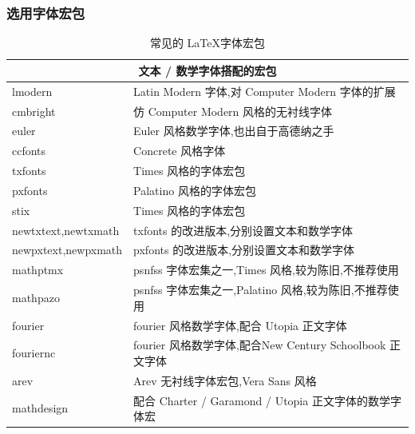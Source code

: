 \documentclass[a4paper]{ctexart}
\begin{document}
    \subsubsection{选用字体宏包}
    \begin{table}[H]
        \centering
        \caption{常见的 \LaTeX 字体宏包}\label{字体宏包}
        \begin{tabular}{ll}
            \toprule
            \multicolumn{2}{c}{\bf{文本 / 数学字体搭配的宏包}}\\
            \midrule
            lmodern                 &Latin Modern 字体,对 Computer Modern 字体的扩展        \\
            cmbright                &仿 Computer Modern 风格的无衬线字体                    \\
            euler                   &Euler 风格数学字体,也出自于高德纳之手                    \\
            ccfonts                 &Concrete 风格字体                                     \\
            txfonts                 &Times 风格的字体宏包                                   \\
            pxfonts                 &Palatino 风格的字体宏包                                \\
            stix                    &Times 风格的字体宏包                                   \\
            newtxtext,newtxmath     &txfonts 的改进版本,分别设置文本和数学字体                  \\
            newpxtext,newpxmath     &pxfonts 的改进版本,分别设置文本和数学字体                  \\
            mathptmx                &psnfss 字体宏集之一,Times 风格,较为陈旧,不推荐使用          \\
            mathpazo                &psnfss 字体宏集之一,Palatino 风格,较为陈旧,不推荐使用       \\
            fourier                 &fourier 风格数学字体,配合 Utopia 正文字体                  \\
            fouriernc               &fourier 风格数学字体,配合New Century Schoolbook 正文字体   \\
            arev                    &Arev 无衬线字体宏包,Vera Sans 风格                        \\
            mathdesign              &配合 Charter / Garamond / Utopia 正文字体的数学字体宏      \\

\end{tabular}
\end{table}
\end{document}
